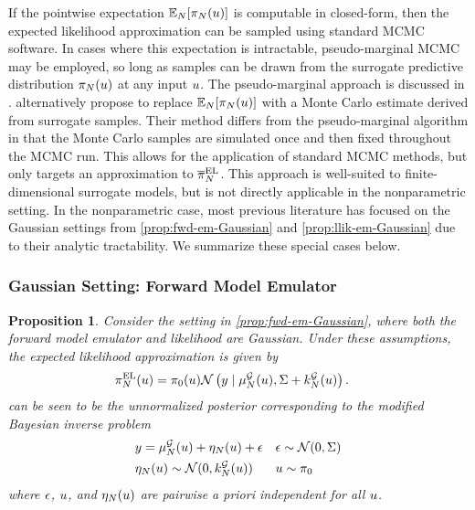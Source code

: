\documentclass[12pt]{article}
\newtheorem{prop}{Proposition}
\begin{document}
 If the pointwise expectation 
 $\E_{\Ndesign}[\postEm[\Ndesign](\Par)]$ is computable in closed-form, then 
the expected likelihood approximation can be sampled using standard MCMC software.
In cases where this expectation is intractable, pseudo-marginal MCMC 
\citep{pseudoMarginalMCMC} may be employed, so long as 
samples can be drawn from the surrogate predictive distribution $\postEm[\Ndesign](\Par)$
at any input $\Par$. The pseudo-marginal approach is discussed in .
\citet{BurknerSurrogate} alternatively propose to replace  $\E_{\Ndesign}[\postEm[\Ndesign](\Par)]$
with a Monte Carlo estimate derived from surrogate samples. Their method differs from the 
pseudo-marginal algorithm in that the Monte Carlo samples are simulated once 
and then fixed throughout the MCMC run. This allows for the application of standard 
MCMC methods, but only targets an approximation to $\postApproxNormMarg[\Ndesign]$.
This approach is well-suited to finite-dimensional surrogate models, but is not directly 
applicable in the nonparametric setting. 
In the nonparametric case, most previous literature 
has focused on the Gaussian settings from \cref{prop:fwd-em-Gaussian} and \cref{prop:llik-em-Gaussian}
due to their analytic tractability. We summarize these special cases below.

\subsubsection{Gaussian Setting: Forward Model Emulator}
\begin{prop} \label{prop:post-approx-fwd-EL-Gaussian}
Consider the setting in \cref{prop:fwd-em-Gaussian}, where both the forward model emulator 
and likelihood are Gaussian. Under these assumptions, the expected likelihood approximation
is given by
\begin{align}
\postApproxMarg[\Ndesign](\Par) 
&= \priorDens(\Par) \Gaussian\left(\obs \given \emMean[\Ndesign]{\fwd}(\Par), \likPar + \emKer[\Ndesign]{\fwd}(\Par) \right). \label{eq:post-approx-fwd-EL-Gaussian}
\end{align}
 can be seen to be the unnormalized posterior corresponding to the modified
Bayesian inverse problem
\begin{align}
&\obs = \emMean[\Ndesign]{\fwd}(\Par) + \eta_{\Ndesign}(\Par) + \noise
&&\noise \sim \Gaussian(0, \likPar)  \label{inv_prob_Gaussian_modified} \\
&\eta_{\Ndesign}(\Par) \sim \Gaussian(0, \emKer[\Ndesign]{\fwd}(\Par))
&&\Par \sim \priorDens  \nonumber
\end{align}
where $\noise$, $\Par$, and $\eta_{\Ndesign}(\Par)$ are pairwise a priori independent for all $\Par$.
\end{prop}
\end{document}
